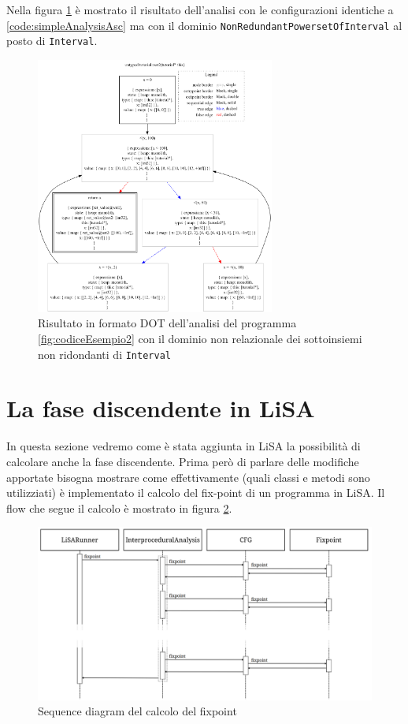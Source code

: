 Nella figura \ref{fig:risultatoAscPowerset} è mostrato il risultato dell'analisi con le configurazioni identiche a \ref{code:simpleAnalysisAsc} ma con il dominio \texttt{NonRedundantPowersetOfInterval} al posto di \texttt{Interval}.
\begin{figure}[ht]
	\centering
	\includegraphics[width=0.7\textwidth]{Immagini/graphvizAscPowerset.png}
	\caption{Risultato in formato DOT dell'analisi del programma \ref{fig:codiceEsempio2} con il dominio non relazionale dei sottoinsiemi non ridondanti di \texttt{Interval}}
	\label{fig:risultatoAscPowerset}
\end{figure}

\section{La fase discendente in LiSA}
In questa sezione vedremo come è stata aggiunta in LiSA la possibilità di calcolare anche la fase discendente. Prima però di parlare delle modifiche apportate bisogna mostrare come effettivamente (quali classi e metodi sono utilizziati) è implementato il calcolo del fix-point di un programma in LiSA. Il flow che segue il calcolo è mostrato in figura \ref{fig:flowFixpoint}. 
\begin{figure}[ht]
	\centering
	\includegraphics[width=\textwidth]{Immagini/flowFixpoint.png}
	\caption{Sequence diagram del calcolo del fixpoint}
	\label{fig:flowFixpoint}
\end{figure}

